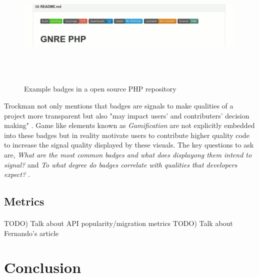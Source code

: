 \documentclass[12pt]{article}
\begin{document}
\begin{figure}
    \centering
    \includegraphics[width=\textwidth,height=6cm,keepaspectratio=true]{gnrephpbadges}
    \caption{
        Example badges in a open source PHP repository \protect\cite{badgeimage}
    }
    \label{phpbadge}
\end{figure}

Trockman not only mentions that badges are signals to make qualities of a project more transparent but also "may impact users' and contributers' decision making" \cite{githubbadges}.
Game like elements known as \textit{Gamification} are not explicitly embedded into these badges but in reality motivate users to contribute higher quality code to increase the signal quality
displayed by these visuals. 
The key questions to ask are, \textit{What are the most common badges and what does displayong them intend to signal?} and \textit{To what degree do badges correlate with qualities that developers expect?} \cite{githubbadges}.





\newpage
\subsection{Metrics}
\paragraph{}
TODO) Talk about API popularity/migration metrics
TODO) Talk about Fernando's article

\newpage 
\section{Conclusion}


\newpage


\end{document}
